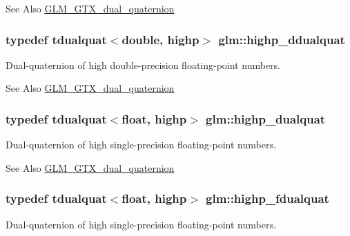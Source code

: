 \begin{DoxySeeAlso}{See Also}
\hyperlink{group__gtx__dual__quaternion}{G\-L\-M\-\_\-\-G\-T\-X\-\_\-dual\-\_\-quaternion} 
\end{DoxySeeAlso}
\hypertarget{group__gtx__dual__quaternion_ga83e4c5d27c8b0a264a3f3aed24f3f84e}{
\subsubsection[{highp\-\_\-ddualquat}]{\setlength{\rightskip}{0pt plus 5cm}typedef tdualquat$<$double, highp$>$ {\bf glm\-::highp\-\_\-ddualquat}}}\label{group__gtx__dual__quaternion_ga83e4c5d27c8b0a264a3f3aed24f3f84e}
Dual-\/quaternion of high double-\/precision floating-\/point numbers.

\begin{DoxySeeAlso}{See Also}
\hyperlink{group__gtx__dual__quaternion}{G\-L\-M\-\_\-\-G\-T\-X\-\_\-dual\-\_\-quaternion} 
\end{DoxySeeAlso}
\hypertarget{group__gtx__dual__quaternion_ga98557c3577757f2ced8f35b1de7fa234}{
\subsubsection[{highp\-\_\-dualquat}]{\setlength{\rightskip}{0pt plus 5cm}typedef tdualquat$<$float, highp$>$ {\bf glm\-::highp\-\_\-dualquat}}}\label{group__gtx__dual__quaternion_ga98557c3577757f2ced8f35b1de7fa234}
Dual-\/quaternion of high single-\/precision floating-\/point numbers.

\begin{DoxySeeAlso}{See Also}
\hyperlink{group__gtx__dual__quaternion}{G\-L\-M\-\_\-\-G\-T\-X\-\_\-dual\-\_\-quaternion} 
\end{DoxySeeAlso}
\hypertarget{group__gtx__dual__quaternion_ga8c46d61c38b2b6d9c5091c667dd20fe8}{
\subsubsection[{highp\-\_\-fdualquat}]{\setlength{\rightskip}{0pt plus 5cm}typedef tdualquat$<$float, highp$>$ {\bf glm\-::highp\-\_\-fdualquat}}}\label{group__gtx__dual__quaternion_ga8c46d61c38b2b6d9c5091c667dd20fe8}
Dual-\/quaternion of high single-\/precision floating-\/point numbers.

